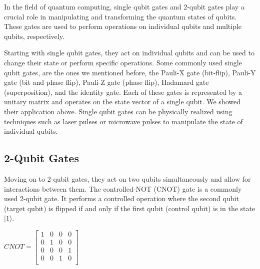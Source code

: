 \documentclass[inscr,ack,preface]{diphdthesis}
\begin{document}
In the field of quantum computing, single qubit gates and 2-qubit gates play a crucial role in manipulating and transforming the quantum states of qubits. These gates are used to perform operations on individual qubits and multiple qubits, respectively.

Starting with single qubit gates, they act on individual qubits and can be used to change their state or perform specific operations. Some commonly used single qubit gates, are the ones we mentioned before, the Pauli-X gate (bit-flip), Pauli-Y gate (bit and phase flip), Pauli-Z gate (phase flip), Hadamard gate (superposition), and the identity gate. Each of these gates is represented by a unitary matrix and operates on the state vector of a single qubit. We showed their application above. Single qubit gates can be physically realized using techniques such as laser pulses or microwave pulses to manipulate the state of individual qubits\cite{microwave}.

\subsection{2-Qubit Gates}
Moving on to 2-qubit gates, they act on two qubits simultaneously and allow for interactions between them. The controlled-NOT (CNOT) gate is a commonly used 2-qubit gate. It performs a controlled operation where the second qubit (target qubit) is flipped if and only if the first qubit (control qubit) is in the state $|1\rangle$.
    \begin{center}
    \Large
    $CNOT = 
        \begin{bmatrix}
            1 & 0 & 0 & 0 \\
            0 & 1 & 0 & 0 \\
            0 & 0 & 0 & 1 \\
            0 & 0 & 1 & 0 \\
        \end{bmatrix}$
    \end{center}
\normalsize
\end{document}
